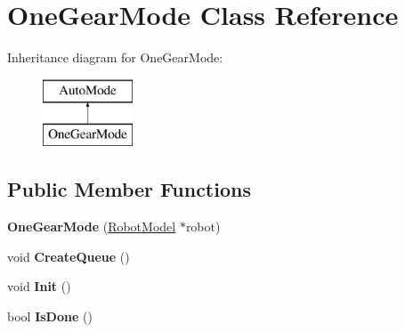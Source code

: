 \hypertarget{class_one_gear_mode}{}\section{One\+Gear\+Mode Class Reference}
\label{class_one_gear_mode}
Inheritance diagram for One\+Gear\+Mode\+:\begin{figure}[H]
\begin{center}
\leavevmode
\includegraphics[height=2.000000cm]{class_one_gear_mode}
\end{center}
\end{figure}
\subsection*{Public Member Functions}
\begin{DoxyCompactItemize}
\item 
\mbox{\label{class_one_gear_mode_a358df92af1a31ceea511aa75b2bff393}} 
{\bfseries One\+Gear\+Mode} (\hyperlink{class_robot_model}{Robot\+Model} $\ast$robot)
\item 
\mbox{\label{class_one_gear_mode_a496910af844fa979cd7d879831dbb609}} 
void {\bfseries Create\+Queue} ()
\item 
\mbox{\label{class_one_gear_mode_a6e4583155a7f2c96f19e937d1315bdf8}} 
void {\bfseries Init} ()
\item 
\mbox{\label{class_one_gear_mode_abbb66b39f2525f4de3d8cc0096d685a0}} 
bool {\bfseries Is\+Done} ()
\end{DoxyCompactItemize}
